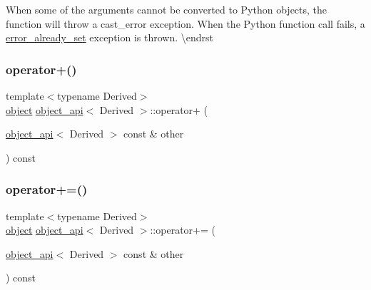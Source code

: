 When some of the arguments cannot be converted to Python objects, the function will throw a {\ttfamily cast\+\_\+error} exception. When the Python function call fails, a {\ttfamily \mbox{\hyperlink{classerror__already__set}{error\+\_\+already\+\_\+set}}} exception is thrown. \textbackslash{}endrst \mbox{\label{classobject__api_ad6ef9a4778c241d7de5be1d156d9fe9f}} 
\subsubsection{\texorpdfstring{operator+()}{operator+()}}
{\footnotesize\ttfamily template$<$typename Derived$>$ \\
\mbox{\hyperlink{classobject}{object}} \mbox{\hyperlink{classobject__api}{object\+\_\+api}}$<$ Derived $>$\+::operator+ (\begin{DoxyParamCaption}\item[{\mbox{\hyperlink{classobject__api}{object\+\_\+api}}$<$ Derived $>$ const \&}]{other }\end{DoxyParamCaption}) const}

\mbox{\label{classobject__api_a45163ca4d236907be32d912e557e788d}} 
\subsubsection{\texorpdfstring{operator+=()}{operator+=()}}
{\footnotesize\ttfamily template$<$typename Derived$>$ \\
\mbox{\hyperlink{classobject}{object}} \mbox{\hyperlink{classobject__api}{object\+\_\+api}}$<$ Derived $>$\+::operator+= (\begin{DoxyParamCaption}\item[{\mbox{\hyperlink{classobject__api}{object\+\_\+api}}$<$ Derived $>$ const \&}]{other }\end{DoxyParamCaption}) const}

\mbox{\label{classobject__api_a7a3fb2cd069528bbd6fc27191644e825}} 
